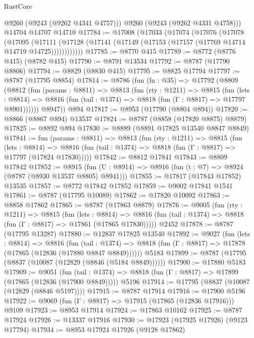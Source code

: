 \begin{lexlean}{RustCore}
\begin{coremodule}
        @9260
        (@9243 (@9262 @4341 @4757)))
      @9260
      (@9243 (@9262 @4331 @4758)))
    @14704
    @14707
    @14710
@17784 := @17008
    (@17033
      (@17074
        (@17076
          (@17078
            (@17095
              (@17111
                (@17128 (@17141 (@17149 (@17153 (@17157 (@17769 @14714 @14719 @14725))))))))))))
@17785 := @8770 @415
@17789 := @8772 (@8776 @415) (@8782 @415)
@17790 := @8791 @13534
@17792 := @8787 (@17790 @8806)
@17794 := @8829 (@8830 @415)
@17795 := @8825 @17794
@17797 := @8787 (@17795 @8854)
@17814 := @8786
    (fun (fn : @35) =>
    @17792
      (@8809
        (@8812
          (fun (params : @8811) =>
          @8813
            (fun (rty : @1211) =>
            @8815
              (fun (lets : @8814) =>
              @8816 (fun (tail : @1374) => @8818 (fun (Γ : @8817) => @17797 @8901))))))
        @8947))
    @894
@17817 := @8953 (@17790 (@8804 @894))
@17820 := @8866 (@8867 @894) @13537
@17824 := @8787 (@8858 (@17820 @8875) @8879)
@17825 := @8892 @894
@17830 := @8889 (@8891 @17825 @13540 @8847 @8849)
@17841 := fun (params : @8811) =>
  @8813
    (fun (rty : @1211) =>
    @8815
      (fun (lets : @8814) =>
      @8816 (fun (tail : @1374) => @8818 (fun (Γ : @8817) => @17797 (@17824 @17830)))))
@17842 := @8812 @17841
@17843 := @8809 @17842
@17852 := @8915
    (fun (U : @8914) => @8916 (fun (t : @7) => @8924 (@8787 (@8930 @13537 @8805) @8941)))
@17855 := @17817 (@17843 @17852) @13535
@17857 := @8772 @17842 @17852
@17859 := @9002 @17841 @1541
@17861 := @8787 (@17795 @10089)
@17862 := @17820 @10092
@17863 := @8858 @17862
@17865 := @8787 (@17863 @8879)
@17876 := @9005
    (fun (rty : @1211) =>
    @8815
      (fun (lets : @8814) =>
      @8816 (fun (tail : @1374) => @8818 (fun (Γ : @8817) => @17861 (@17865 @17830)))))
    @2452
@17878 := @8787 (@17795 @13287)
@17880 := @12837 @17825 @13540
@17892 := @9027
    (fun (lets : @8814) =>
    @8816
      (fun (tail : @1374) =>
      @8818 (fun (Γ : @8817) => @17878 (@17865 (@12836 (@17880 @8847 @8849))))))
    @5183
@17899 := @8787 (@17795 (@8837 (@10087 (@12829 (@8846 (@5184 @8849))))))
@17900 := @17880 @5183
@17909 := @9051
    (fun (tail : @1374) => @8818 (fun (Γ : @8817) => @17899 (@17865 (@12836 (@17900 @8849)))))
    @5196
@17914 := @17795 (@8837 (@10087 (@12829 (@8846 @5197))))
@17915 := @8787 @17914
@17916 := @17900 @5196
@17922 := @9069 (fun (Γ : @8817) => @17915 (@17865 (@12836 @17916))) @9109
@17923 := @8953 @17914
@17924 := @17863 @10162
@17925 := @8787 @17924
@17926 := @13337 @17916
@17930 := @17923 (@17925 @17926) (@9123 @17794)
@17934 := @8953 @17924 @17926 (@9128 @17862)

\end{coremodule}
\end{lexlean}
